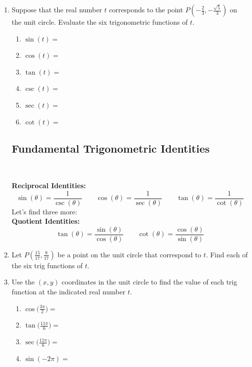 \newpage









\begin{enumerate}
\item Suppose that the real number $t$ corresponds to the point $P(-\frac{2}{3},-\frac{\sqrt{5}}{3})$ on the unit circle.  Evaluate the six trigonometric functions of $t$.
\begin{enumerate}
\item $\sin(t)=$\\[.5in]
\item $\cos(t)=$ \\[.5in]
\item $\tan(t)=$ \\[.5in]
\item $\csc(t)=$ \\[.5in]
\item $\sec(t)=$ \\[.5in]
\item $\cot(t)=$ \\[.5in]
\end{enumerate}

\subsection{Fundamental Trigonometric Identities} ~

\textbf{Reciprocal Identities:  }
$$\sin(\theta)=\frac{1}{\csc(\theta)} \quad \quad \cos(\theta)=\frac{1}{\sec(\theta)} \quad \quad \tan(\theta)=\frac{1}{\cot(\theta)}$$
Let's find three more:\\[.2in]

\textbf{Quotient Identities:  }
$$\tan(\theta)=\frac{\sin(\theta)}{\cos(\theta)} \quad \quad \cot(\theta)=\frac{\cos(\theta)}{\sin(\theta)}$$

\item Let $P(\frac{15}{17}, \frac{8}{17})$ be a point on the unit circle that correspond to $t$.  Find each of the six trig functions of $t$.\\[1.7in]

\item Use the $(x,y)$ coordinates in the unit circle to find the value of each trig function at the indicated real number $t$.\\

\begin{enumerate}
\item $\displaystyle \cos\Big(\frac{3\pi}{2}\Big)=$\\[.2in]
\item $\displaystyle \tan\Big(\frac{11\pi}{6}\Big)=$\\[.5in]
\item $\displaystyle \sec\Big(\frac{11\pi}{6}\Big)=$\\[.5in]
\item $\displaystyle \sin(-2\pi)=$\\[.2in]
\end{enumerate}


\end{enumerate}
